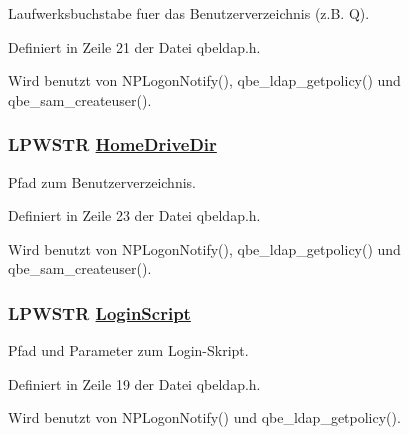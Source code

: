 Laufwerksbuchstabe fuer das Benutzerverzeichnis (z.B. Q). 



Definiert in Zeile 21 der Datei qbeldap.h.

Wird benutzt von NPLogon\-Notify(), qbe\_\-ldap\_\-getpolicy() und qbe\_\-sam\_\-createuser().\hypertarget{structQbeSAS__HostPolicy_QbeSAS__HostPolicyo4}{
\subsubsection[HomeDriveDir]{\setlength{\rightskip}{0pt plus 5cm}LPWSTR \hyperlink{structQbeSAS__HostPolicy_QbeSAS__HostPolicyo4}{Home\-Drive\-Dir}}}
\label{structQbeSAS__HostPolicy_QbeSAS__HostPolicyo4}


Pfad zum Benutzerverzeichnis. 



Definiert in Zeile 23 der Datei qbeldap.h.

Wird benutzt von NPLogon\-Notify(), qbe\_\-ldap\_\-getpolicy() und qbe\_\-sam\_\-createuser().\hypertarget{structQbeSAS__HostPolicy_QbeSAS__HostPolicyo2}{
\subsubsection[LoginScript]{\setlength{\rightskip}{0pt plus 5cm}LPWSTR \hyperlink{structQbeSAS__HostPolicy_QbeSAS__HostPolicyo2}{Login\-Script}}}
\label{structQbeSAS__HostPolicy_QbeSAS__HostPolicyo2}


Pfad und Parameter zum Login-Skript. 



Definiert in Zeile 19 der Datei qbeldap.h.

Wird benutzt von NPLogon\-Notify() und qbe\_\-ldap\_\-getpolicy().